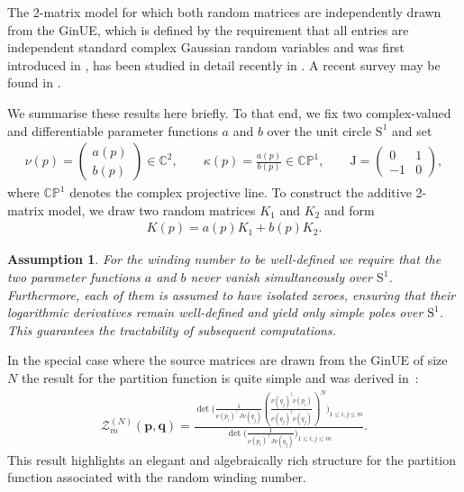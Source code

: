 \documentclass[pdflatex,sn-mathphys-num]{sn-jnl}
\theoremstyle{thmstyleone}
\newtheorem{assumption}[theorem]{Assumption}
\numberwithin{equation}{section}
\newcommand{\Sp}{\mathrm{S}^{1}}
\newcommand{\C}{\mathbb{C}}
\newcommand{\CP}{\mathbb{CP}^{1}}
\begin{document}
The 2-matrix model for which both random matrices are independently drawn from the GinUE, which is defined by the requirement that all entries are independent standard complex Gaussian random variables and was first introduced in \cite{ginibreStatisticalEnsemblesComplex1965}, has been studied in detail recently in \cite{hahnWindingNumberStatistics2023}. A recent survey may be found in \cite{byunProgressStudyGinibre2025}.

We summarise these results here briefly. To that end, we fix two complex-valued and differentiable parameter functions $a$ and $b$ over the unit circle $\Sp$ and set 
\begin{align}\label{functions1}
    \nu\left(p\right)=\begin{pmatrix}
a\left ( p \right )
\\ 
b\left ( p \right )
\end{pmatrix}\in\C^2 ,\qquad\kappa\left(p\right)=\frac{a\left ( p \right )}{b\left ( p \right )}\in\CP,\qquad\mathrm{J}=\begin{pmatrix}
        0 & 1 \\ 
        -1 & 0
        \end{pmatrix},
\end{align}
where $\CP$ denotes the complex projective line.
To construct the additive 2-matrix model, we draw two random matrices $K_{1}$ and $K_{2}$ and form 
\begin{align}\label{def:2matrixmodel}
    K(p)=a\left(p\right)K_{1}+b\left(p\right)K_{2}.
\end{align}
\begin{assumption}\label{assumption1}
    For the winding number to be well-defined we require that the two parameter functions $a$ and $b$ never vanish simultaneously over $\Sp$. Furthermore, each of them is assumed to have isolated zeroes, ensuring that their logarithmic derivatives remain well-defined and yield only simple poles over $\Sp$. This guarantees the tractability of subsequent computations.
\end{assumption}

In the special case where the source matrices are drawn from the GinUE of size $N$ the result for the partition function is quite simple and was derived in~\cite[Sec.~IV]{hahnWindingNumberStatistics2023}:
\begin{align}\label{partitiongaussian}
    \mathscr{Z}^{\left(N\right)}_{m}\left ( \mathbf{p},\mathbf{q} \right )=\frac{\det\Big(\frac{1}{\nu\left ( p_{i} \right )^{\top}J\nu\left ( q_{j} \right )}\left ( \frac{\nu\left ( q_{j} \right )^{\dagger}\nu\left ( p_{i} \right )}{\nu\left ( q_{j} \right )^{\dagger}\nu\left ( q_{j} \right )} \right )^{N}\Big)_{1\leq i,j\leq m}}{\det\Big(\frac{1}{\nu\left ( p_{i} \right )^{\top}J\nu\left ( q_{j} \right )}\Big)_{1\leq i,j\leq m}}.
\end{align}
This result highlights an elegant and algebraically rich structure for the partition function associated with the random winding number.
\end{document}
